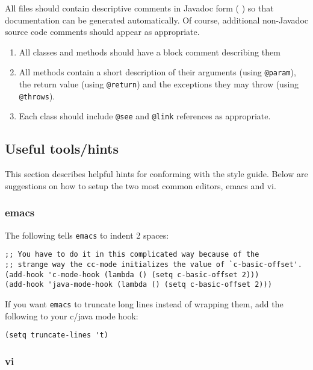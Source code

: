 All files should contain descriptive comments
in Javadoc\TMweb{} form (
\xlink{{\tt \JavadocURL}} {\JavadocURL}
) so
that documentation can be generated automatically.  Of course,
additional non-Javadoc source code comments should appear as
appropriate.

\begin{enumerate}
\item All classes and methods should have a block comment describing
them
\item All methods contain a short description of their arguments
(using {\tt @param}), the return value (using {\tt @return}) and the
exceptions they may throw (using {\tt @throws}).
\item Each class should include {\tt @see} and {\tt @link} 
references as appropriate.
\end{enumerate}

\subsection {Useful tools/hints}

This section describes helpful hints for conforming with the style
guide.  Below are suggestions on how to setup the two most common
editors, emacs and vi. 

\subsubsection{emacs} 

The following tells {\tt emacs} to indent 2 spaces:
\begin{verbatim}
;; You have to do it in this complicated way because of the
;; strange way the cc-mode initializes the value of `c-basic-offset'.
(add-hook 'c-mode-hook (lambda () (setq c-basic-offset 2)))
(add-hook 'java-mode-hook (lambda () (setq c-basic-offset 2)))
\end{verbatim}
If you want {\tt emacs} to truncate long lines instead of wrapping them, add
the following to your c/java mode hook:
\begin{verbatim}
(setq truncate-lines 't)
\end{verbatim}

\subsubsection{vi}\label{options:vi/vim}

